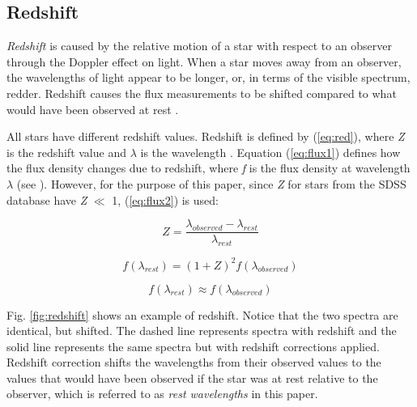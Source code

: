 \documentclass[conference]{IEEEtran}
\begin{document}
	\subsection{Redshift}\label{sec:redshift}

	\textit{Redshift} is caused by the relative motion of a star with respect to an observer through the Doppler effect on light. When a star moves away from an observer, the wavelengths of light appear to be longer, or, in terms of the visible spectrum, redder. Redshift causes the flux measurements to be shifted compared to what would have been observed at rest \cite{Carroll, Chromey}.

All stars have different redshift values. Redshift is defined by (\ref{eq:red}), where \textit{Z} is the redshift value and $\lambda$ is the wavelength \cite{Carroll, Chromey}. Equation (\ref{eq:flux1})  defines how the flux density changes due to redshift, where \textit{f} is the flux density at wavelength $\lambda$ (see \cite{Chromey}). However, for the purpose of this paper, since \textit{Z} for stars from the SDSS database have \textit{Z} $\ll$ 1, (\ref{eq:flux2}) is used: 
        
        \begin{equation}\label{eq:red}
            Z = \frac{\lambda_{observed} - \lambda_{rest}}{\lambda_{rest}}
        \end{equation}

        \begin{equation}\label{eq:flux1}
            f(\lambda_{rest}) = (1 + Z)^2 f(\lambda_{observed}) 
        \end{equation}

        \begin{equation}\label{eq:flux2}
            f(\lambda_{rest}) \approx f(\lambda_{observed})
        \end{equation}


 Fig. \ref{fig:redshift} shows an example of redshift. Notice that the two spectra are identical, but shifted. The dashed line represents spectra with redshift and the solid line represents the same spectra but with redshift corrections applied. Redshift correction shifts the wavelengths from their observed values to the values that would have been observed if the star was at rest relative to the observer, which is referred to as \textit{rest wavelengths} in this paper. 
\end{document}
